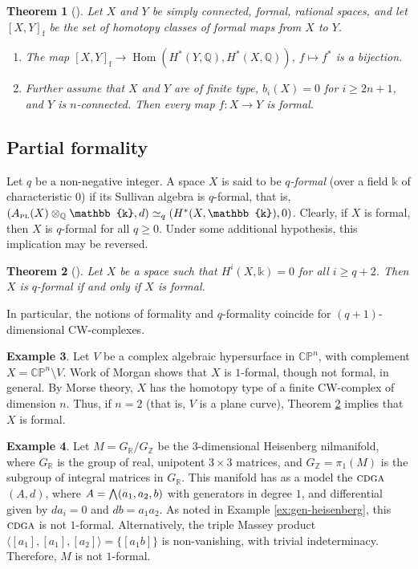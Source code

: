 \documentclass{article}
\numberwithin{equation}{section}
\newtheorem{theorem}{Theorem}[section]
\theoremstyle{definition}
\newtheorem{example}[theorem]{Example}
\newcommand{\Z}{\mathbb{Z}}
\newcommand{\Q}{\mathbb{Q}}
\newcommand{\R}{\mathbb{R}}
\newcommand{\CP}{\mathbb{CP}}
\renewcommand{\k}{\mathbb{k}}
\newcommand{\cdga}{\ensuremath{\textsc{cdga}}}
\DeclareMathOperator{\Hom}{{Hom}}
\newcommand{\apl}{A_{\scriptscriptstyle{{\rm PL}}}}
\newcommand{\bwedge}{\mbox{\normalsize $\bigwedge$}}
\begin{document}
\begin{theorem}[\cite{Ark}]
\label{thm:arkowitz}
Let $X$ and $Y$ be simply connected, formal, rational spaces, 
and let $[X, Y]_{\mathrm{f}}$ be the set of homotopy classes 
of formal maps from $X$ to $Y$.
\begin{enumerate}
\item  \label{ak1}
The map $[X,Y]_{\mathrm{f}} \to \Hom(H^*(Y,\Q), H^*(X,\Q))$, 
$f\mapsto f^*$ is a bijection.
\item \label{ak2}
Further assume that $X$ and $Y$ are of finite type, $b_i(X)=0$ 
for $i\ge 2n+1$, and $Y$ is $n$-connected. Then every map 
$f\colon X\to Y$ is formal.
\end{enumerate}
\end{theorem}

\subsection{Partial formality}
\label{subsec:partial}
Let $q$ be a non-negative integer.  A space $X$ is said to be {\em $q$-formal}\/ 
(over a field $\k$ of characteristic $0$) if its Sullivan algebra is $q$-formal, 
that is, $(\apl(X)\otimes_{\Q} \k,d)\simeq_q (H^*(X,\k),0)$. 
Clearly, if $X$ is formal, then $X$ is $q$-formal for all $q\ge 0$.  
Under some additional hypothesis, this implication may be reversed.

\begin{theorem}[\cite{Mc10}]
\label{thm:partial-to-formal}
Let $X$ be a space such that $H^{i}(X,\k)=0$ for all $i\ge q+2$. 
Then $X$ is $q$-formal if and only if $X$ is formal.
\end{theorem}

In particular, the notions of formality and $q$-formality 
coincide for $(q+1)$-dimensional CW-complexes. 

\begin{example}
\label{ex:curves}
Let $V$ be a complex algebraic hypersurface in $\CP^{n}$, 
with complement $X=\CP^{n}\setminus V$. 
Work of Morgan \cite{Mo} shows that $X$ is $1$-formal, though 
not formal, in general. By Morse theory, $X$ has the homotopy 
type of a finite CW-complex of dimension $n$.  Thus, if $n=2$ 
(that is, $V$ is a plane curve), Theorem \ref{thm:partial-to-formal} 
implies that $X$ is formal.
\end{example}

\begin{example}
\label{ex:heis-massey}
Let $M=G_{\R}/G_{\Z}$ be the $3$-dimensional Heisenberg 
nilmanifold, where $G_{\R}$ is the group of real, 
unipotent $3\times 3$ matrices, and $G_{\Z}=\pi_1(M)$ 
is the subgroup of integral matrices in $G_{\R}$.  
This manifold has as a model the $\cdga$ $(A,d)$, where 
$A=\bwedge (a_1,a_2,b)$ with generators in degree $1$, 
and differential given by $da_i=0$ and $db=a_1a_2$. 
As noted in Example \ref{ex:gen-heisenberg}, this $\cdga$ 
is not $1$-formal. Alternatively, the triple Massey product 
$\langle [a_1],[a_1],[a_2] \rangle= \{[a_1b]\}$ 
is non-vanishing, with trivial indeterminacy.  
Therefore, $M$ is not $1$-formal. 
\end{example}
\end{document}
